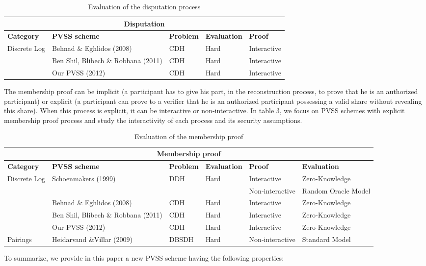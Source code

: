\documentclass[submission,copyright,creativecommons]{eptcs}
\begin{document}
\begin{table*}[tbp] \centering \begin{tabular}{|p{1.9cm}||p{3cm}||p{1.5cm}||p{1.7cm}||p{1.7cm}|}
\hline
\multicolumn{5}{|c|}{\textbf{Disputation}} \\ \hline
\textbf{Category} & \textbf{PVSS scheme} & \textbf{Problem} & \textbf{Evaluation} & \textbf{Proof} \\ \hline
\multirow{1}{*}{Discrete Log} & Behnad \& Eghlidos (2008) & CDH & Hard & 
Interactive \\ \cline{2-5}
& Ben Shil, Blibech \& Robbana (2011) & CDH & Hard & Interactive \\ 
\cline{2-5}
& Our PVSS (2012) & CDH & Hard & Interactive \\ \hline
\end{tabular}\caption{Evaluation of the disputation process}\label{Evaluation of the
disputation process}\end{table*}The membership proof can be implicit (a participant has to give his part, in
the reconstruction process, to prove that he is an authorized participant)
or explicit (a participant can prove to a verifier that he is an authorized
participant possessing a valid share without revealing this share). When
this process is explicit, it can be interactive or non-interactive. In table
3, we focus on PVSS schemes with explicit membership proof process and study
the interactivity of each process and its security assumptions.

\begin{table*}[tbp] \centering \begin{tabular}{|p{1.9cm}||p{3.2cm}||p{1.5cm}||p{1.7cm}||p{1.5cm}||p{1.7cm}|}
\hline
\multicolumn{6}{|c|}{\textbf{Membership proof}} \\ \hline
\textbf{Category} & \textbf{PVSS scheme} & \textbf{Problem} & \textbf{Evaluation} & \textbf{Proof} & \textbf{Evaluation} \\ \hline
\multirow{4}{*}{Discrete Log} & \multirow{2}{*}{Schoenmakers (1999)} & \multirow{2}{*}{DDH} & \multirow{2}{*}{Hard} & Interactive & Zero-Knowledge \\ \cline{5-6}
&  &  &  & Non-interactive & Random Oracle Model \\ \cline{2-6}\cline{5-6}
& Behnad \& Eghlidos (2008) & CDH & Hard & Interactive & Zero-Knowledge \\ 
\cline{2-6}
& Ben Shil, Blibech \& Robbana (2011) & CDH & Hard & Interactive & 
Zero-Knowledge \\ \cline{2-6}
& Our PVSS (2012) & CDH & Hard & Interactive & Zero-Knowledge \\ \hline
\multirow{1}{*}{Pairings} & Heidarvand \&Villar (2009) & DBSDH & Hard & 
Non-interactive & Standard Model \\ \hline
\end{tabular}\caption{Evaluation of the membership proof}\label{Evaluation of the
membership proof}\end{table*}To summarize, we provide in this paper a new PVSS scheme having the
following properties:
\end{document}
